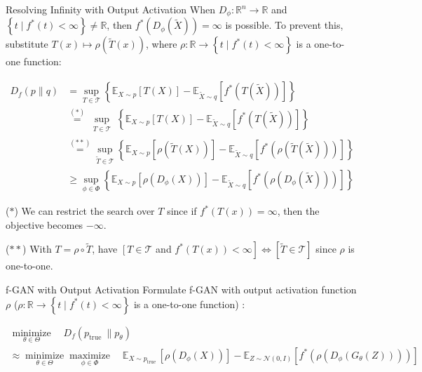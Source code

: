 \begin{frame}[allowframebreaks]

\begin{myconceptblock}{21.24}{Resolving Infinity with Output Activation}
    When $D_{\phi}: \mathbb{R}^{n} \rightarrow \mathbb{R}$ and $\left\{t \mid f^{*}(t)<\infty\right\} \neq \mathbb{R}$, then $f^{*}\left(D_{\phi}(\tilde{X})\right)=\infty$ is possible. To prevent this, substitute $T(x) \mapsto \rho(\tilde{T}(x))$, where $\rho: \mathbb{R} \rightarrow\left\{t \mid f^{*}(t)<\infty\right\}$ is a one-to-one function:

    $$
    \begin{aligned}
    D_{f}(p \| q) & =\sup _{T \in \mathcal{T}}\left\{\mathbb{E}_{X \sim p}[T(X)]-\mathbb{E}_{\tilde{X} \sim q}\left[f^{*}(T(\tilde{X}))\right]\right\} \\
    & \stackrel{(*)}{=} \sup _{\substack{T \in \mathcal{T}}}\left\{\mathbb{E}_{X \sim p}[T(X)]-\mathbb{E}_{\tilde{X} \sim q}\left[f^{*}(T(\tilde{X}))\right]\right\} \\
    & \stackrel{(* *)}{=} \sup _{\tilde{T} \in \mathcal{T}}\left\{\mathbb{E}_{X \sim p}[\rho(\tilde{T}(X))]-\mathbb{E}_{\tilde{X} \sim q}\left[f^{*}(\rho(\tilde{T}(\tilde{X})))\right]\right\} \\
    & \geq \sup _{\phi \in \Phi}\left\{\mathbb{E}_{X \sim p}\left[\rho\left(D_{\phi}(X)\right)\right]-\mathbb{E}_{\tilde{X} \sim q}\left[f^{*}\left(\rho\left(D_{\phi}(\tilde{X})\right)\right)\right]\right\}
    \end{aligned}
    $$

    ($*$) We can restrict the search over $T$ since if $f^{*}(T(x))=\infty$, then the objective becomes $-\infty$.

    ($**$) With $T=\rho \circ \tilde{T}$, have $\left[T \in \mathcal{T}\right.$ and $\left.f^{*}(T(x))<\infty\right] \Leftrightarrow[\tilde{T} \in \mathcal{T}]$ since $\rho$ is one-to-one.
\end{myconceptblock}

\end{frame}

\begin{frame}[allowframebreaks]

\begin{mydefinitionblock}{21.25}{f-GAN with Output Activation}
    Formulate f-GAN with output activation function $\rho$ ($\rho: \mathbb{R} \rightarrow\left\{t \mid f^{*}(t)<\infty\right\}$ is a one-to-one function) :

    $$
    \begin{gathered}
    \underset{\theta \in \Theta}{\operatorname{minimize}} \quad D_{f}\left(p_{\text {true }} \| p_{\theta}\right) \\
    \approx \underset{\theta \in \Theta}{\operatorname{minimize}} \underset{\phi \in \Phi}{\operatorname{maximize}} \quad \mathbb{E}_{X \sim p_{\text {true }}}\left[\rho\left(D_{\phi}(X)\right)\right]-\mathbb{E}_{Z \sim \mathcal{N}(0, I)}\left[f^{*}\left(\rho\left(D_{\phi}\left(G_{\theta}(Z)\right)\right)\right)\right]
    \end{gathered}
    $$
\end{mydefinitionblock}

\end{frame}

